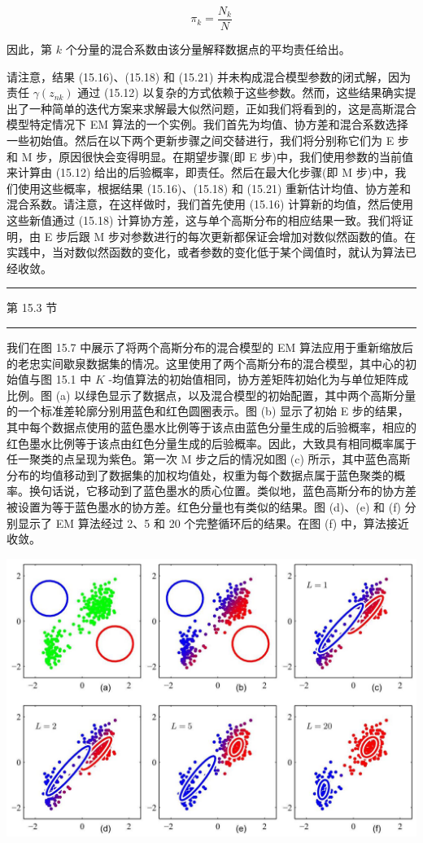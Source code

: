 \documentclass[10pt]{article}
\newcommand{\HRule}{\begin{center}\rule{0.9\linewidth}{0.2mm}\end{center}}
\begin{document}
\[
{\pi }_{k} = \frac{{N}_{k}}{N} \tag{15.21}
\]

因此，第 \(k\) 个分量的混合系数由该分量解释数据点的平均责任给出。

请注意，结果 (15.16)、(15.18) 和 (15.21) 并未构成混合模型参数的闭式解，因为责任 \(\gamma \left( {z}_{nk}\right)\) 通过 (15.12) 以复杂的方式依赖于这些参数。然而，这些结果确实提出了一种简单的迭代方案来求解最大似然问题，正如我们将看到的，这是高斯混合模型特定情况下 EM 算法的一个实例。我们首先为均值、协方差和混合系数选择一些初始值。然后在以下两个更新步骤之间交替进行，我们将分别称它们为 E 步和 M 步，原因很快会变得明显。在期望步骤(即 E 步)中，我们使用参数的当前值来计算由 (15.12) 给出的后验概率，即责任。然后在最大化步骤(即 M 步)中，我们使用这些概率，根据结果 (15.16)、(15.18) 和 (15.21) 重新估计均值、协方差和混合系数。请注意，在这样做时，我们首先使用 (15.16) 计算新的均值，然后使用这些新值通过 (15.18) 计算协方差，这与单个高斯分布的相应结果一致。我们将证明，由 E 步后跟 M 步对参数进行的每次更新都保证会增加对数似然函数的值。在实践中，当对数似然函数的变化，或者参数的变化低于某个阈值时，就认为算法已经收敛。

\HRule

第 15.3 节

\HRule

我们在图 15.7 中展示了将两个高斯分布的混合模型的 EM 算法应用于重新缩放后的老忠实间歇泉数据集的情况。这里使用了两个高斯分布的混合模型，其中心的初始值与图 15.1 中 \(K\) -均值算法的初始值相同，协方差矩阵初始化为与单位矩阵成比例。图 (a) 以绿色显示了数据点，以及混合模型的初始配置，其中两个高斯分量的一个标准差轮廓分别用蓝色和红色圆圈表示。图 (b) 显示了初始 E 步的结果，其中每个数据点使用的蓝色墨水比例等于该点由蓝色分量生成的后验概率，相应的红色墨水比例等于该点由红色分量生成的后验概率。因此，大致具有相同概率属于任一聚类的点呈现为紫色。第一次 \(\mathrm{M}\) 步之后的情况如图 (c) 所示，其中蓝色高斯分布的均值移动到了数据集的加权均值处，权重为每个数据点属于蓝色聚类的概率。换句话说，它移动到了蓝色墨水的质心位置。类似地，蓝色高斯分布的协方差被设置为等于蓝色墨水的协方差。红色分量也有类似的结果。图 (d)、(e) 和 (f) 分别显示了 EM 算法经过 2、5 和 20 个完整循环后的结果。在图 (f) 中，算法接近收敛。

\begin{center}
\includegraphics[max width=1.0\textwidth]{images/0194e279-9b28-703a-88f4-c3ac21e2010d_492_248_351_1300_882_0.jpg}
\end{center}
\hspace*{3em} 
\end{document}
